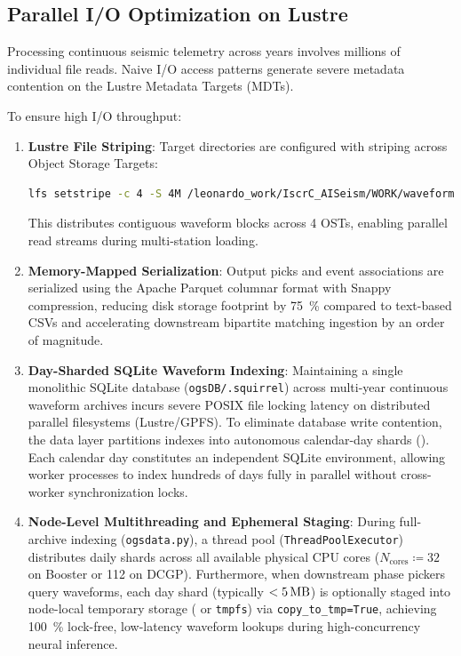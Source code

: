 \subsection{Parallel I/O Optimization on Lustre}
Processing continuous seismic telemetry across years involves
millions of individual file reads. Naive I/O access patterns
generate severe metadata contention on the Lustre Metadata Targets (MDTs).

To ensure high I/O throughput:
\begin{enumerate}
  \item \textbf{Lustre File Striping}: Target directories are
    configured with striping across Object Storage Targets:
  \begin{lstlisting}[language=bash,basicstyle=\scriptsize\ttfamily]
lfs setstripe -c 4 -S 4M /leonardo_work/IscrC_AISeism/WORK/waveform
  \end{lstlisting}
    This distributes contiguous waveform blocks across \num{4} OSTs,
    enabling parallel read streams during multi-station loading.
  \item \textbf{Memory-Mapped Serialization}: Output picks and event
    associations are serialized using the Apache Parquet columnar
    format with Snappy compression, reducing disk storage footprint
    by \qty{75}{\percent} compared to text-based CSVs and accelerating
    downstream bipartite matching ingestion by an order of magnitude.
  \item \textbf{Day-Sharded SQLite Waveform Indexing}: Maintaining a
    single monolithic SQLite database (\texttt{ogsDB/.squirrel}) across
    multi-year continuous waveform archives incurs severe POSIX file
    locking latency on distributed parallel filesystems (Lustre/GPFS).
    To eliminate database write contention, the data layer partitions
    indexes into autonomous calendar-day shards
    ().
    Each calendar day constitutes an independent SQLite environment,
    allowing worker processes to index hundreds of days fully in parallel
    without cross-worker synchronization locks.
  \item \textbf{Node-Level Multithreading and Ephemeral Staging}: During
    full-archive indexing (\texttt{ogsdata.py}), a thread pool
    (\texttt{ThreadPoolExecutor}) distributes daily shards across all
    available physical \ac{CPU} cores ($N_{\mathrm{cores}} \coloneqq \num{32}$
    on Booster or \num{112} on \ac{DCGP}). Furthermore, when downstream phase
    pickers query waveforms, each day shard (typically $< \qty{5}{\mega\byte}$)
    is optionally staged into node-local temporary storage ( or
    \texttt{tmpfs}) via \texttt{copy\_to\_tmp=True}, achieving
    \qty{100}{\percent} lock-free, low-latency
    waveform lookups during high-concurrency neural inference.
\end{enumerate}

